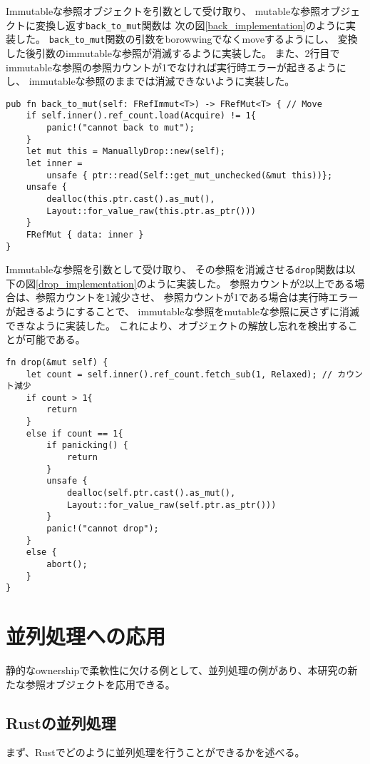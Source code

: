 \documentclass{sumiilab-paper}
\theoremstyle{mystyle}
\numberwithin{definition}{chapter} %
\begin{document}
Immutableな参照オブジェクトを引数として受け取り、
mutableな参照オブジェクトに変換し返す\texttt{back\_to\_mut}関数は
次の図\ref{back_implementation}のように実装した。
\texttt{back\_to\_mut}関数の引数をborowwingでなくmoveするようにし、
変換した後引数のimmutableな参照が消滅するように実装した。
また、2行目でimmutableな参照の参照カウントが1でなければ実行時エラーが起きるようにし、
immutableな参照のままでは消滅できないように実装した。
\begin{lstlisting}[caption=関数back\_to\_mutの実装, label=back_implementation, captionpos=b]
pub fn back_to_mut(self: FRefImmut<T>) -> FRefMut<T> { // Move
    if self.inner().ref_count.load(Acquire) != 1{
        panic!("cannot back to mut");
    }
    let mut this = ManuallyDrop::new(self);
    let inner =
        unsafe { ptr::read(Self::get_mut_unchecked(&mut this))};
    unsafe {
        dealloc(this.ptr.cast().as_mut(), 
        Layout::for_value_raw(this.ptr.as_ptr()))
    }
    FRefMut { data: inner }
}
\end{lstlisting}

Immutableな参照を引数として受け取り、
その参照を消滅させる\texttt{drop}関数は以下の図\ref{drop_implementation}のように実装した。
参照カウントが2以上である場合は、参照カウントを1減少させ、
参照カウントが1である場合は実行時エラーが起きるようにすることで、
immutableな参照をmutableな参照に戻さずに消滅できなように実装した。
これにより、オブジェクトの解放し忘れを検出することが可能である。
\begin{lstlisting}[caption=関数back\_to\_mutの実装, label=drop_implementation, captionpos=b]
fn drop(&mut self) {
    let count = self.inner().ref_count.fetch_sub(1, Relaxed); // カウント減少
    if count > 1{
        return
    }
    else if count == 1{
        if panicking() {
            return
        }
        unsafe {
            dealloc(self.ptr.cast().as_mut(), 
            Layout::for_value_raw(self.ptr.as_ptr()))
        }
        panic!("cannot drop");
    }
    else {
        abort();
    }
}
\end{lstlisting}

\chapter{並列処理への応用}
静的なownershipで柔軟性に欠ける例として、並列処理の例があり、本研究の新たな参照オブジェクトを応用できる。

\section{Rustの並列処理}
まず、Rustでどのように並列処理を行うことができるかを述べる。
\end{document}
